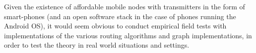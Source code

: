 Given the existence of affordable mobile nodes with transmitters in the form of smart-phones (and an open software stack in the case of phones running the Android OS), it would seem obvious to conduct empirical field tests with implementations of the various routing algorithms and graph implementations, in order to test the theory in real world situations and settings.  

